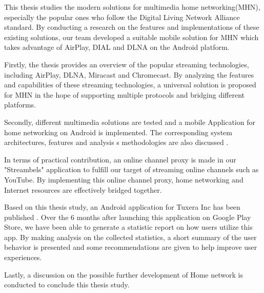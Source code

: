 This thesis studies the modern solutions for multimedia home networking(MHN), especially the popular ones who follow the Digital Living
 Network Alliance standard. By conducting a research on the features and implementations of these existing solutions, our team developed a suitable mobile solution for MHN
 which takes advantage of AirPlay, DIAL and DLNA on the Android
 platform.

Firstly, the thesis provides an overview of the popular streaming technologies, including AirPlay,
DLNA, Miracast and Chromecast. By analyzing the features and capabilities of
these streaming technologies, a universal solution is proposed for MHN in the hope of  supporting multiple protocols and bridging
 different platforms.

Secondly, different multimedia solutions are tested and a mobile Application
for home networking on Android is implemented. The corresponding system architectures, features and analysis
s methodologies are also discussed .

In terms of practical contribution, an online channel proxy is made in our "Streambels" application to fulfill our target of streaming online channels such as YouTube. By implementing this online channel proxy, home
 networking and Internet resources are effectively bridged together. 

Based on this thesis study, an Android application for Tuxera Inc has been published
. Over the 6 months after launching this application on Google Play Store, we have been able to generate a statistic report on how users utilize this app. By making analysis on the collected statistics, a short summary of the user behavior is presented and some recommendations are given to help improve user experiences.

Lastly, a discussion on the possible further
 development of Home network is conducted to conclude this thesis study. 
